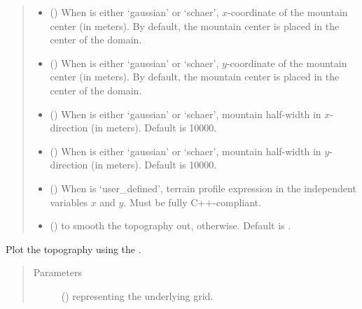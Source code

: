 \documentclass[letterpaper,10pt,english]{sphinxmanual}
\begin{document}
\begin{fulllineitems}
\begin{fulllineitems}
\begin{quote}
\begin{description}
\begin{itemize}
\item {} 
 () \textendash{} When  is either ‘gaussian’ or ‘schaer’, \(x\)-coordinate of the mountain center
(in meters). By default, the mountain center is placed in the center of the domain.

\item {} 
 () \textendash{} When  is either ‘gaussian’ or ‘schaer’, \(y\)-coordinate of the mountain center
(in meters). By default, the mountain center is placed in the center of the domain.

\item {} 
 () \textendash{} When  is either ‘gaussian’ or ‘schaer’, mountain half-width in \(x\)-direction
(in meters). Default is 10000.

\item {} 
 () \textendash{} When  is either ‘gaussian’ or ‘schaer’, mountain half-width in \(y\)-direction
(in meters). Default is 10000.

\item {} 
 () \textendash{} When  is ‘user\_defined’, terrain profile expression in the independent variables
\(x\) and \(y\). Must be fully C++-compliant.

\item {} 
 () \textendash{}  to smooth the topography out,  otherwise. Default is .

\end{itemize}

\end{description}\end{quote}

\end{fulllineitems}


\begin{fulllineitems}
\label{\detokenize{api:grids.topography.Topography2d.plot}}
Plot the topography using the .
\begin{quote}\begin{description}
\item[{Parameters}] \leavevmode
{} () \textendash{} {\hyperref[\detokenize{api:grids.grid_xy.GridXY}]{}} representing the underlying grid.


\end{description}
\end{quote}
\end{fulllineitems}
\end{fulllineitems}
\end{document}
